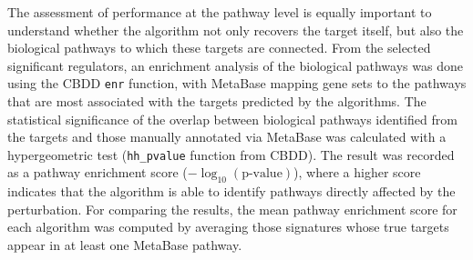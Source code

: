 The assessment of performance at the pathway level is equally important to understand whether the algorithm not only recovers the target itself, but also the biological pathways to which these targets are connected.
From the selected significant regulators, an enrichment analysis of the biological pathways was done using the \gls{CBDD} \texttt{enr} function, with MetaBase mapping gene sets to the pathways that are most associated with the targets predicted by the algorithms.
The statistical significance of the overlap between biological pathways identified from the targets and those manually annotated via MetaBase was calculated with a hypergeometric test (\texttt{hh\_pvalue} function from \gls{CBDD}).
The result was recorded as a pathway enrichment score ($-\log_{10}(\text{p-value})$), where a higher score indicates that the algorithm is able to identify pathways directly affected by the perturbation. For comparing the results, the mean pathway enrichment score for each algorithm was computed by averaging those signatures whose true targets appear in at least one MetaBase pathway.

